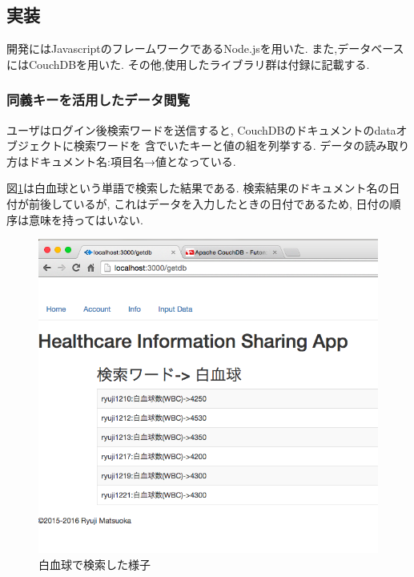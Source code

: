 \subsection{実装}
	開発にはJavascriptのフレームワークであるNode.jsを用いた.
	また,データベースにはCouchDBを用いた.
	その他,使用したライブラリ群は付録に記載する.\cite{bibi9}

	\subsubsection{同義キーを活用したデータ閲覧}

		ユーザはログイン後検索ワードを送信すると,
		CouchDBのドキュメントのdataオブジェクトに検索ワードを
		含でいたキーと値の組を列挙する.
		データの読み取り方はドキュメント名:項目名→値となっている.

		図\ref{getdb}は白血球という単語で検索した結果である.
		検索結果のドキュメント名の日付が前後しているが,
		これはデータを入力したときの日付であるため,
		日付の順序は意味を持ってはいない.

			\begin{figure}[htbp]
				\begin{center}
					\includegraphics[width=15cm, bb=0 0 652 603, clip]{./gazou/getdb2.png}
				\end{center}
				\caption{白血球で検索した様子}
				\label{getdb}
			\end{figure}


